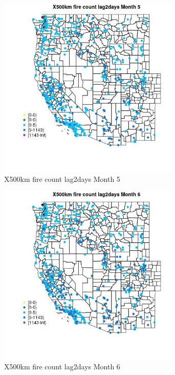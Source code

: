 \begin{figure} 
\centering  
\includegraphics[width=0.77\textwidth]{Code_Outputs/Report_ML_input_PM25_Step4_part_e_de_duplicated_aves_compiled_2019-05-14wNAs_MapObsMo5X500km_fire_count_lag2days.jpg} 
\caption{\label{fig:Report_ML_input_PM25_Step4_part_e_de_duplicated_aves_compiled_2019-05-14wNAsMapObsMo5X500km_fire_count_lag2days}X500km fire count lag2days Month 5} 
\end{figure} 
 

\begin{figure} 
\centering  
\includegraphics[width=0.77\textwidth]{Code_Outputs/Report_ML_input_PM25_Step4_part_e_de_duplicated_aves_compiled_2019-05-14wNAs_MapObsMo6X500km_fire_count_lag2days.jpg} 
\caption{\label{fig:Report_ML_input_PM25_Step4_part_e_de_duplicated_aves_compiled_2019-05-14wNAsMapObsMo6X500km_fire_count_lag2days}X500km fire count lag2days Month 6} 
\end{figure} 
 

